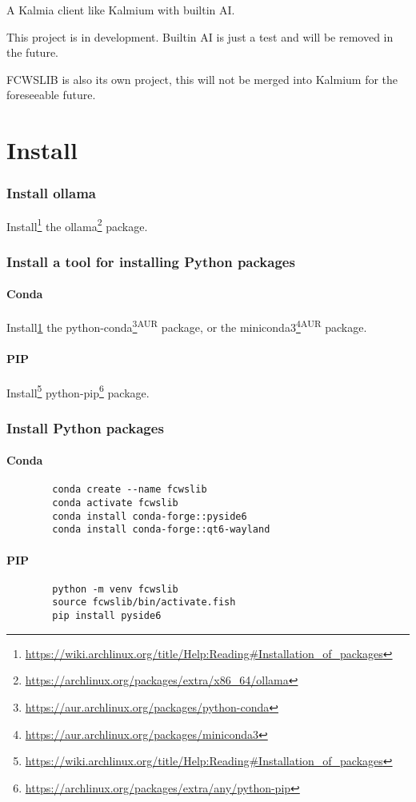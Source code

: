 \documentclass{article}
\begin{document}
	A Kalmia client like Kalmium with builtin AI.
	
	This project is in development. Builtin AI is just a test and will be removed in the future. 
	
	FCWSLIB is also its own project, this will not be merged into Kalmium for the foreseeable future.
	
	\part{Install}
	
	\section{Install ollama}
		Install\footnote{\url{https://wiki.archlinux.org/title/Help:Reading\#Installation\_of\_packages}\label{install}} the ollama\footnote{\url{https://archlinux.org/packages/extra/x86_64/ollama}} package.
	
	\section{Install a tool for installing Python packages}
	
	\subsection{Conda}
	
	Install\ref{install} the python-conda\footnote{\url{https://aur.archlinux.org/packages/python-conda}}\textsuperscript{AUR} package, or the miniconda3\footnote{\url{https://aur.archlinux.org/packages/miniconda3}}\textsuperscript{AUR} package.
	
	\subsection{PIP}

	Install\footnote{\url{https://wiki.archlinux.org/title/Help:Reading\#Installation\_of\_packages}} python-pip\footnote{\url{https://archlinux.org/packages/extra/any/python-pip}} package.
	
	\section{Install Python packages}
	
	\subsection{Conda}
	
	\begin{lstlisting}
		conda create --name fcwslib
		conda activate fcwslib
		conda install conda-forge::pyside6
		conda install conda-forge::qt6-wayland
	\end{lstlisting}
	
	\subsection{PIP}
	
	\begin{lstlisting}
		python -m venv fcwslib
		source fcwslib/bin/activate.fish
		pip install pyside6
	\end{lstlisting}
\end{document}
